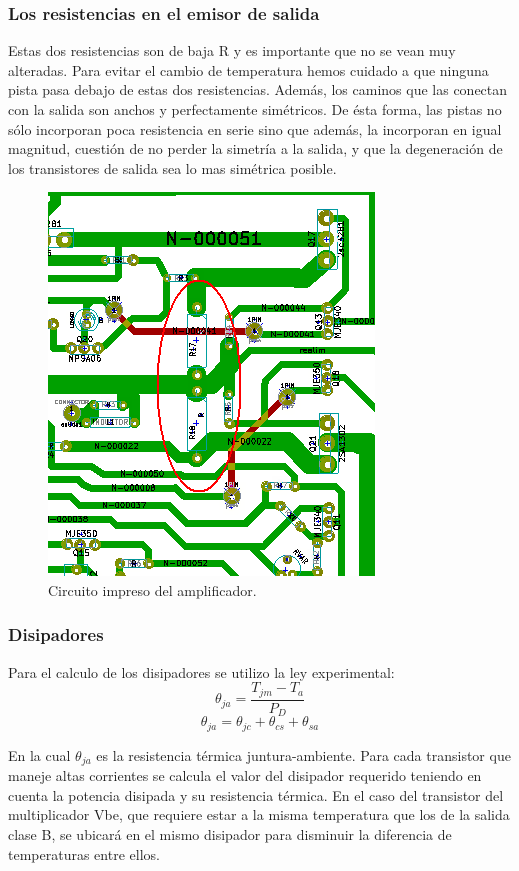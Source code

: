 \subsubsection*{Los resistencias en el emisor de salida}
Estas dos resistencias son de baja R y es importante que no se vean muy alteradas. Para evitar el cambio de temperatura hemos cuidado a que ninguna pista pasa debajo de estas dos resistencias. Además, los caminos que las conectan con la salida son anchos y perfectamente simétricos. De ésta forma, las pistas no sólo incorporan poca resistencia en serie sino que además, la incorporan en igual magnitud, cuestión de no perder la simetría a la salida, y que la degeneración de los transistores de salida sea lo mas simétrica posible.

\begin{figure}[H]
\centering
\includegraphics[scale=1]{img/PCB3.png}
\caption{Circuito impreso del amplificador.}
\end{figure}

\subsubsection{Disipadores}
\bigskip
Para el calculo de los disipadores se utilizo la ley experimental:
$$
   \theta_{ja}=\dfrac{T_{jm}-T_a}{P_D}
$$
$$
	\theta_{ja}=\theta_{jc}+\theta_{cs}+\theta_{sa}
$$

En la cual $\theta_{ja}$ es la resistencia térmica juntura-ambiente. Para cada transistor que maneje altas corrientes se calcula el valor del disipador requerido teniendo en cuenta la potencia disipada y su resistencia térmica. En el caso del transistor del multiplicador Vbe, que requiere estar a la misma temperatura que los de la salida clase B, se ubicará en el mismo disipador para disminuir la diferencia de temperaturas entre ellos.

